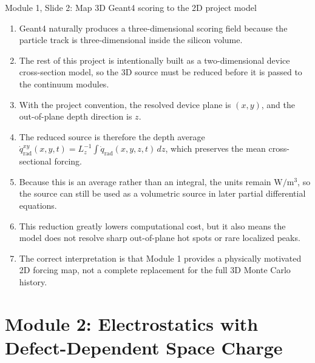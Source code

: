 \documentclass[11pt]{article}
\newcommand{\qrad}{\dot{q}_{\mathrm{rad}}}
\begin{document}
\begin{slidebox}{Module 1, Slide 2: Map 3D Geant4 scoring to the 2D project model}
\begin{enumerate}
\item Geant4 naturally produces a three-dimensional scoring field because the particle track is three-dimensional inside the silicon volume.
\item The rest of this project is intentionally built as a two-dimensional device cross-section model, so the 3D source must be reduced before it is passed to the continuum modules.
\item With the project convention, the resolved device plane is \((x,y)\), and the out-of-plane depth direction is \(z\).
\item The reduced source is therefore the depth average \(\qrad^{xy}(x,y,t)=L_z^{-1}\int \qrad(x,y,z,t)\,dz\), which preserves the mean cross-sectional forcing.
\item Because this is an average rather than an integral, the units remain \(\mathrm{W/m^3}\), so the source can still be used as a volumetric source in later partial differential equations.
\item This reduction greatly lowers computational cost, but it also means the model does not resolve sharp out-of-plane hot spots or rare localized peaks.
\item The correct interpretation is that Module 1 provides a physically motivated 2D forcing map, not a complete replacement for the full 3D Monte Carlo history.
\end{enumerate}
\end{slidebox}

\section{Module 2: Electrostatics with Defect-Dependent Space Charge}
\end{document}
